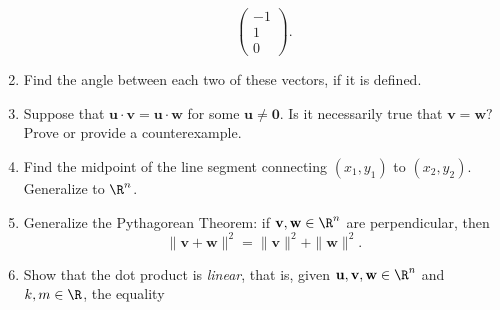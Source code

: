\begin{enumerate}
\[\begin{pmatrix}
   -1\\
   1\\
   0
  \end{pmatrix}.
 \]
\item
 Find the angle between each two of these vectors, if it is defined.\\[1em]
\item 
 Suppose that $\mathbf{u} \cdot \mathbf{v} = \mathbf{u} \cdot \mathbf{w}$ for
 some $\mathbf{u} \neq \mathbf{0}$. Is it necessarily true that $\mathbf{v} =
 \mathbf{w}?$ Prove or provide a counterexample.
\item 
 Find the midpoint of the line segment connecting $(x_1,y_1)$ to $(x_2,y_2)$.
 Generalize to $\R^{n}$.
\item 
 Generalize the Pythagorean Theorem: if $\mathbf{v},\mathbf{w} \in \R^{n}$ are
 perpendicular, then
 \[
  \|\mathbf{v}+\mathbf{w}\|^2 = \|\mathbf{v}\|^2 + \|\mathbf{w}\|^2.
 \]
\item 
 Show that the dot product is \emph{linear}, that is, given
 $\mathbf{u},\mathbf{v},\mathbf{w} \in \R^{n}$ and $k,m \in \R$, the equality

\end{enumerate}
